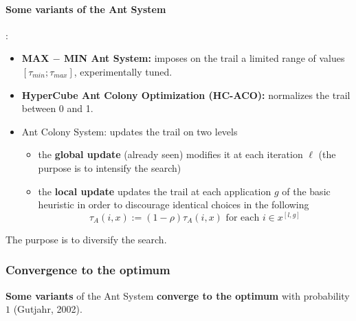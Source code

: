 \documentclass[11pt]{article}
\begin{document}
	\newpage
	
	\paragraph{Some variants of the Ant System}:
	\begin{itemize}
		\item \textbf{MAX $-$ MIN Ant System:} imposes on the trail a limited range of values $[\tau_{min}; \tau_{max}]$, experimentally tuned.\\
		
		\item \textbf{HyperCube Ant Colony Optimization (HC-ACO):} normalizes the trail between 0 and 1.\\
		
		\item Ant Colony System: updates the trail on two levels
		\begin{itemize}
			\item the \textbf{global update} (already seen) modifies it at each iteration $\ell$ (the purpose is to intensify the search)
			
			\item the \textbf{local update} updates the trail at each application $g$ of the basic heuristic in order to discourage identical choices in the following
			$$ \tau_A (i, x) := (1 - \rho) \tau_A (i, x) \text{ for each } i \in x^{[l,g]}$$
		\end{itemize}
		\nn
	\end{itemize}
	The purpose is to diversify the search.\\
	
	\newpage
	
	\subsubsection{Convergence to the optimum}
	\textbf{Some variants} of the Ant System \textbf{converge to the optimum} with probability $1$ (Gutjahr, 2002).\\
	
\end{document}
